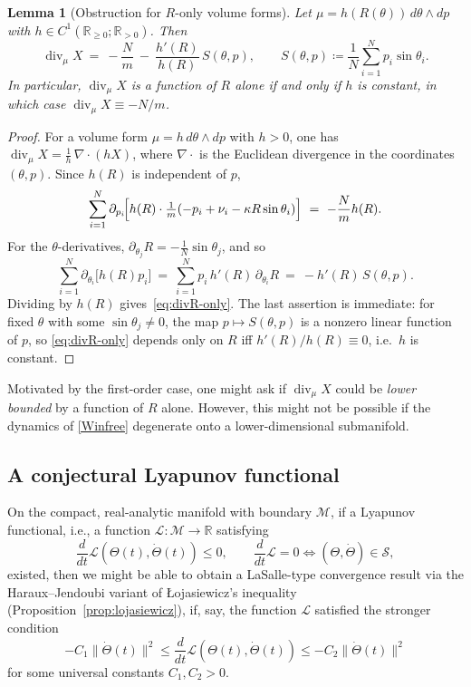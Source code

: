\documentclass[11pt,reqno]{amsart}
\newcounter{name}
\newcommand{\R}{\mathbb{R}}
\newtheorem{lemma}{Lemma}[section]
\theoremstyle{definition}
\theoremstyle{remark}
\begin{document}
\begin{lemma}[Obstruction for $R$-only volume forms]\label{lem:vol-obstr}
	Let $\mu=h(R(\theta))\,d\theta\wedge dp$ with $h\in C^1(\R_{\ge 0};\R_{>0})$.
	Then
	\begin{equation}\label{eq:divR-only}
		\operatorname{div}_\mu X
		\ =\ -\frac{N}{m}\ -\ \frac{h'(R)}{h(R)}\,S(\theta,p),
		\qquad
		S(\theta,p)\coloneqq\frac{1}{N}\sum_{i=1}^N p_i\sin\theta_i.
	\end{equation}
	In particular, $\operatorname{div}_\mu X$ is a function of $R$ alone
	if and only if $h$ is constant, in which case $\operatorname{div}_\mu X\equiv-N/m$.
\end{lemma}
\begin{proof}
	For a volume form $\mu=h\,d\theta\wedge dp$ with $h>0$, one has
	$\operatorname{div}_\mu X=\tfrac{1}{h}\,\nabla\!\cdot\!(hX)$, where
	$\nabla\!\cdot$ is the Euclidean divergence in the coordinates
	$(\theta,p)$. Since $h(R)$ is independent of $p$,
	\[
	\sum_{i=1}^N\partial_{p_i}\!\Bigl[h(R)\cdot\tfrac{1}{m}(-p_i+\nu_i-\kappa R\sin\theta_i)\Bigr]
	\ =\ -\frac{N}{m}h(R).
	\]
	For the $\theta$-derivatives,
	$\partial_{\theta_j}R=-\tfrac{1}{N}\sin\theta_j$, and so
	\[
	\sum_{i=1}^N\partial_{\theta_i}\bigl[h(R)p_i\bigr]
	\ =\ \sum_{i=1}^N p_i\,h'(R)\,\partial_{\theta_i}R
	\ =\ -h'(R)\,S(\theta,p).
	\]
	Dividing by $h(R)$ gives~\eqref{eq:divR-only}. The last assertion is
	immediate: for fixed $\theta$ with some $\sin\theta_{j}\neq 0$, the
	map $p\mapsto S(\theta,p)$ is a nonzero linear function of $p$, so
	\eqref{eq:divR-only} depends only on $R$ iff $h'(R)/h(R)\equiv 0$, i.e.\
	$h$ is constant.
\end{proof}
Motivated by the first-order case, one might ask if $\operatorname{div}_\mu X$ could be \emph{lower bounded} by a function of $R$ alone. However, this might not be possible if the dynamics of \eqref{Winfree} degenerate onto a lower-dimensional submanifold.


\subsection{A conjectural Lyapunov functional}

On the compact, real-analytic manifold with boundary $\mathcal{M}$, if a Lyapunov functional, i.e., a function 
$\mathcal L\colon\mathcal M\to\R$ satisfying
\begin{equation}\label{eq:lyap-strong}
	\frac{d}{dt}\mathcal L(\Theta(t),\dot\Theta(t))\le 0,\qquad
	\frac{d}{dt}\mathcal L=0\iff(\Theta,\dot\Theta)\in\mathcal S,
\end{equation}
existed, then we might be able to obtain a LaSalle-type convergence result via the Haraux--Jendoubi variant of \L ojasiewicz's inequality
(Proposition~\ref{prop:lojasiewicz}), if, say, the function $\mathcal{L}$ satisfied the stronger condition
\begin{equation}\label{eq:lyap-stronger}
-C_1\|\dot\Theta(t)\|^2\le\frac{d}{dt}\mathcal L(\Theta(t),\dot\Theta(t))\le -C_2\|\dot\Theta(t)\|^2
\end{equation}
for some universal constants $C_1,C_2>0$.
\end{document}
